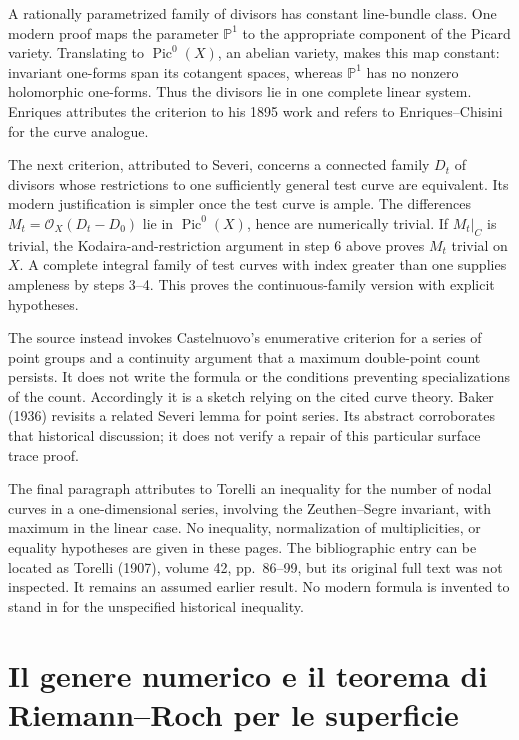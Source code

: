 A rationally parametrized family of divisors has constant line-bundle class. One modern proof maps the parameter \(\mathbb{P}^1\) to the appropriate component of the Picard variety. Translating to \(\operatorname{Pic}^0(X)\), an abelian variety, makes this map constant: invariant one-forms span its cotangent spaces, whereas \(\mathbb{P}^1\) has no nonzero holomorphic one-forms. Thus the divisors lie in one complete linear system. Enriques attributes the criterion to his 1895 work and refers to Enriques--Chisini for the curve analogue.

The next criterion, attributed to Severi, concerns a connected family \(D_t\) of divisors whose restrictions to one sufficiently general test curve are equivalent. Its modern justification is simpler once the test curve is ample. The differences \(M_t=\mathcal O_X(D_t-D_0)\) lie in \(\operatorname{Pic}^0(X)\), hence are numerically trivial. If \(M_t|_C\) is trivial, the Kodaira-and-restriction argument in step 6 above proves \(M_t\) trivial on \(X\). A complete integral family of test curves with index greater than one supplies ampleness by steps 3--4. This proves the continuous-family version with explicit hypotheses.

The source instead invokes Castelnuovo's enumerative criterion for a series of point groups and a continuity argument that a maximum double-point count persists. It does not write the formula or the conditions preventing specializations of the count. Accordingly it is a sketch relying on the cited curve theory. Baker (1936) revisits a related Severi lemma for point series. Its abstract corroborates that historical discussion; it does not verify a repair of this particular surface trace proof.

The final paragraph attributes to Torelli an inequality for the number of nodal curves in a one-dimensional series, involving the Zeuthen--Segre invariant, with maximum in the linear case. No inequality, normalization of multiplicities, or equality hypotheses are given in these pages. The bibliographic entry can be located as Torelli (1907), volume 42, pp.~86--99, but its original full text was not inspected. It remains an assumed earlier result. No modern formula is invented to stand in for the unspecified historical inequality.

\chapter[Il genere numerico]{Il genere numerico e il teorema di Riemann--Roch per le superficie}\label{enriques-iv}

